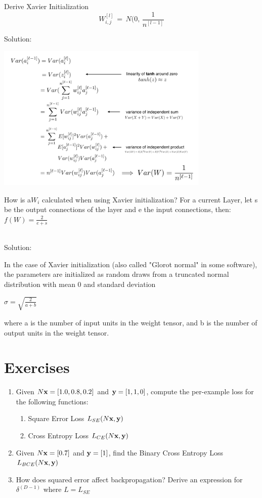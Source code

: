 \begin{example}
Derive Xavier Initialization
$$W_{i,j}^{[l]}\,=\,N(0,\,\frac{1}{n^{[l-1]}}$$

Solution:
\begin{center}
\includegraphics[width=4in]{images/Chapter 10/10.5(3).png}

\end{center}

\end{example}

\begin{example}
How is a$ W_{i}$ calculated when using Xavier initialization?
For a current Layer, let s be the output connections of the layer and e the input connections, then: $ f(W)= \frac{2}{e+s} $

~\\Solution:

In the case of Xavier initialization (also called "Glorot normal" in some software), the parameters are initialized as random draws from a truncated normal distribution with mean 0 and standard deviation

$\sigma = \sqrt{\frac{2}{a+b}}$

where a is the number of input units in the weight tensor, and b is the number of output units in the weight tensor.
\end{example}

\section{Exercises}
\begin{enumerate}
    \item Given $N\vx=[1.0, 0.8, 0.2]$ and $\vy=[1, 1, 0]$, compute the per-example loss for the following functions:
    \begin{enumerate}
        \item Square Error Loss $L_{SE}(N\vx, \vy)$
        \item Cross Entropy Loss $L_{CE}(N\vx, \vy)$
    \end{enumerate}
    \item Given $N\vx=[0.7]$ and $\vy=[1]$, find the Binary Cross Entropy Loss $L_{BCE}(N\vx, \vy)$
    \item How does squared error affect backpropagation? Derive an expression for $\delta^{(D-1)}$ where $L=L_{SE}$
\end{enumerate}

